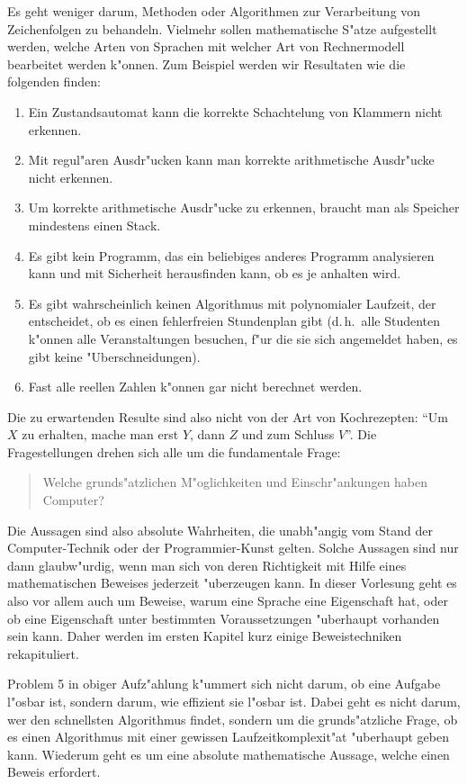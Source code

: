 Es geht weniger darum, Methoden oder Algorithmen zur Verarbeitung
von Zeichenfolgen zu behandeln.
Vielmehr sollen mathematische S"atze aufgestellt werden, welche
Arten von Sprachen mit welcher Art von Rechnermodell bearbeitet
werden k"onnen.
Zum Beispiel werden wir Resultaten wie die folgenden finden:
\begin{enumerate}
\item Ein Zustandsautomat kann die korrekte Schachtelung von
Klammern nicht erkennen.
\item Mit regul"aren Ausdr"ucken kann man korrekte arithmetische
Ausdr"ucke nicht erkennen.
\item Um korrekte arithmetische Ausdr"ucke zu erkennen, braucht man als
Speicher mindestens einen Stack.
\item Es gibt kein Programm, das ein beliebiges anderes Programm
analysieren kann und mit Sicherheit herausfinden kann, ob es je anhalten
wird.
\item Es gibt wahrscheinlich keinen Algorithmus mit polynomialer Laufzeit,
der entscheidet, ob es einen fehlerfreien Stundenplan gibt (d.\,h.~alle 
Studenten k"onnen alle Veranstaltungen besuchen, f"ur die sie sich
angemeldet haben, es gibt keine "Uberschneidungen).
\item Fast alle reellen Zahlen k"onnen gar nicht berechnet werden.
\end{enumerate}
Die zu erwartenden Resulte sind also nicht von der Art von Kochrezepten:
``Um $X$ zu erhalten, mache man erst $Y$, dann $Z$ und zum Schluss $V$''.
Die Fragestellungen drehen sich alle um die fundamentale Frage:
\begin{quote}
Welche grunds"atzlichen M"oglichkeiten und Einschr"ankungen haben
Computer?
\end{quote}
Die Aussagen sind also absolute Wahrheiten, die unabh"angig vom Stand
der Com\-pu\-ter-Technik oder der Programmier-Kunst gelten.
Solche Aussagen sind nur dann glaub\-w"urdig, wenn man sich von deren
Richtigkeit mit Hilfe eines mathematischen Beweises jederzeit "uberzeugen
kann. In dieser Vorlesung geht es also vor allem auch um Beweise, 
warum eine Sprache eine Eigenschaft hat, oder ob eine Eigenschaft
unter bestimmten Voraussetzungen "uberhaupt vorhanden sein kann.
Daher werden im ersten Kapitel kurz einige Beweistechniken rekapituliert.

Problem 5 in obiger Aufz"ahlung k"ummert sich nicht darum, ob eine
Aufgabe l"osbar ist, sondern darum, wie effizient sie l"osbar ist.
Dabei geht es nicht darum, wer den schnellsten Algorithmus findet,
sondern um die grunds"atzliche Frage, ob es einen Algorithmus mit
einer gewissen Laufzeitkomplexit"at "uberhaupt geben kann.
Wiederum geht es um eine absolute mathematische Aussage, welche
einen Beweis erfordert. 

